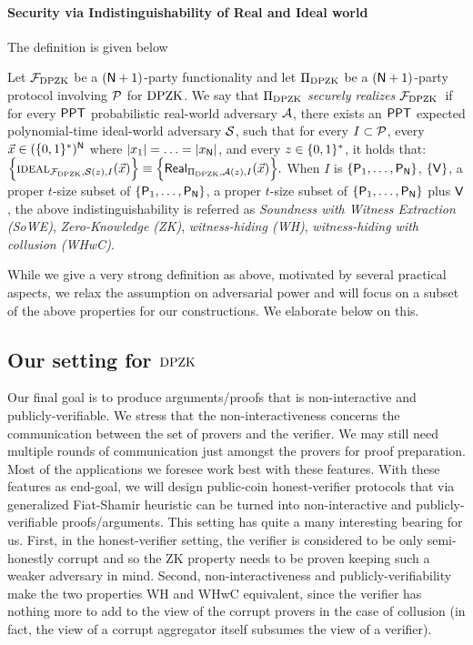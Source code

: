 \paragraph{Security via Indistinguishability of Real and Ideal world} The definition is given below
\begin{definition}
Let $\mathcal{F}_{\text{DPZK}}$ be a $(\mathsf{N}+1)$-party  functionality and let $\Pi_{\text{DPZK}}$ be a $(\mathsf{N}+1)$-party protocol involving $\mathcal{P}$ for $\text{DPZK}$. We say that  $\Pi_{\text{DPZK}}$ {\em securely realizes} $\mathcal{F}_{\text{DPZK}}$~if for every $\mathsf{PPT}$ probabilistic  real-world adversary $\mathcal{A}$, there exists an $\mathsf{PPT}$  expected polynomial-time ideal-world adversary $\mathcal{S}$, such that for every $I \subset \mathcal{P}$, every $\vec{x} \in (\{0,1\}^*)^{\mathsf{N}}$ where $\left\lvert x_1 \right\rvert = \ldots= \left\lvert x_{\mathsf{N}} \right\rvert$, and every $z \in \{0,1\}^*$, it holds that:
	$\Big\{\textsc{ideal}_{\mathcal{F}_{\text{DPZK}}, \mathcal{S}(z),I}(\vec{x}) \Big\} \equiv \Big\{ \mathsf{Real}_{\Pi_{\text{DPZK}}, \mathcal{A}(z),I}(\vec{x}) \Big\}. $
When $I$ is  $\{\mathsf{P}_1,\ldots,\mathsf{P}_{\mathsf{N}}\}$, $\{\mathsf{V}\}$, a proper $t$-size subset of $\{\mathsf{P}_1,\ldots,\mathsf{P}_{\mathsf{N}}\}$, a proper $t$-size subset of $\{\mathsf{P}_1,\ldots,\mathsf{P}_{\mathsf{N}}\}$ plus   $\mathsf{V}$, the above indistinguishability  is referred as {\em Soundness with Witness Extraction (SoWE)}, {\em Zero-Knowledge (ZK)}, {\em witness-hiding (WH)}, {\em witness-hiding with collusion (WHwC)}.   	
\end{definition}

While we give a very strong definition as above, motivated by several practical aspects, we relax the assumption on adversarial power and will focus on a subset of the above properties for our constructions. We elaborate below on this.

\subsection{Our setting for $\text{DPZK}$}
Our final goal is to produce arguments/proofs that is non-interactive and publicly-verifiable.  We stress that the non-interactiveness concerns the communication between the set of provers and the verifier. We may still need multiple rounds of communication just amongst the provers for proof preparation.   Most of the applications we foresee work best  with these features. With these features as end-goal, we  will design public-coin honest-verifier  protocols that via generalized Fiat-Shamir heuristic \cite{FS86, BCS16} can be turned into non-interactive and publicly-verifiable proofs/arguments. This setting has quite a many interesting bearing for us. First,   in the honest-verifier setting, the verifier is considered to be only semi-honestly corrupt and so the ZK property needs to be proven keeping such a weaker adversary in mind. Second,  non-interactiveness and publicly-verifiability make the two properties WH and WHwC equivalent, since the verifier has nothing more to add to the view of the corrupt provers in the case of collusion (in fact, the view of a corrupt aggregator itself subsumes the view of a verifier). 

